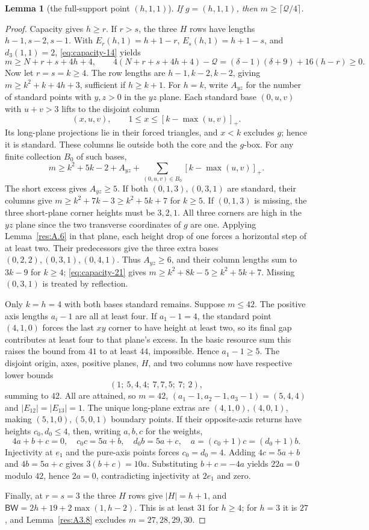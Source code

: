 \documentclass[11pt]{article}
\newtheorem{lemma}[theorem]{Lemma}
\theoremstyle{definition}
\theoremstyle{remark}
\theoremstyle{plain}
\begin{document}
\begin{lemma}[the full-support point $(h,1,1)$]\label{res:A3.6}
If $g=(h,1,1)$, then $m\ge\lceil \mathcal Q/4\rceil$.
\end{lemma}
\begin{proof}
Capacity gives $h\ge r$.  If $r>s$, the three $H$ rows have lengths
$h-1,s-2,s-1$.  With $E_r(h,1)=h+1-r$, $E_s(h,1)=h+1-s$,
and $d_3(1,1)=2$, \eqref{eq:capacity-14} yields
\[
 m\ge N+r+s+4h+4,\qquad
 4(N+r+s+4h+4)-\mathcal Q=(\delta-1)(\delta+9)+16(h-r)\ge0.
\]
Now let $r=s=k\ge4$.  The row lengths are $h-1,k-2,k-2$, giving
$m\ge k^2+k+4h+3$, sufficient if $h\ge k+1$.
For $h=k$, write $A_{yz}$ for the number of standard points with $y,z>0$ in the $yz$ plane.
Each standard base $(0,u,v)$ with $u+v>3$ lifts to the disjoint column
\[
 (x,u,v),\qquad 1\le x\le[k-\max(u,v)]_+.
\]
Its long-plane projections lie in their forced triangles, and $x<k$
excludes $g$; hence it is standard.  These columns lie outside both the
core and the $g$-box.  For any finite collection $B_0$ of such bases,
\[
 m\ge k^2+5k-2+A_{yz}
       +\sum_{(0,u,v)\in B_0}[k-\max(u,v)]_+.\tag{3.21}\label{eq:capacity-21}
\]
The short excess gives $A_{yz}\ge5$.  If both $(0,1,3),(0,3,1)$ are
standard, their columns give $m\ge k^2+7k-3\ge k^2+5k+7$ for $k\ge5$.
If $(0,1,3)$ is missing, the three short-plane corner heights must be
$3,2,1$. All three corners are high in the $yz$ plane since the two
transverse coordinates of $g$ are one. Applying Lemma~\ref{res:A.6}
in that plane, each height drop of one forces a horizontal step of at
least two.  Their predecessors
give the three extra bases $(0,2,2),(0,3,1),(0,4,1)$.
Thus $A_{yz}\ge6$, and their column lengths sum to $3k-9$ for $k\ge4$;
\eqref{eq:capacity-21} gives $m\ge k^2+8k-5\ge k^2+5k+7$.
Missing $(0,3,1)$ is treated by reflection.

Only $k=h=4$ with both bases standard remains. Suppose $m\le42$.
The positive axis lengths $a_i-1$ are all at least four.
If $a_1-1=4$, the standard point $(4,1,0)$ forces the last $xy$ corner to
have height at least two, so its final gap contributes at least four
to that plane's excess.  In the basic resource sum this raises the
bound from $41$ to at least $44$, impossible. Hence $a_1-1\ge5$.
The disjoint origin, axes, positive planes, $H$, and two columns now
have respective lower bounds
\[
 (1;\ 5,4,4;\ 7,7,5;\ 7;\ 2),
\]
summing to $42$.  All are attained, so $m=42$,
$(a_1-1,a_2-1,a_3-1)=(5,4,4)$ and $|E_{12}|=|E_{13}|=1$.
The unique long-plane extras are $(4,1,0),(4,0,1)$, making
$(5,1,0),(5,0,1)$ boundary points.  If their opposite-axis returns
have heights $c_0,d_0\le4$, then, writing $a,b,c$ for the weights,
\[
 4a+b+c=0,\quad c_0c=5a+b,\quad d_0b=5a+c,
 \quad a=(c_0+1)c=(d_0+1)b.
\]
Injectivity at $e_1$ and the pure-axis points forces $c_0=d_0=4$.
Adding $4c=5a+b$ and $4b=5a+c$ gives $3(b+c)=10a$.
Substituting $b+c=-4a$ yields $22a=0$ modulo $42$, hence $2a=0$,
contradicting injectivity at $2e_1$ and zero.

Finally, at $r=s=3$ the three $H$ rows give $|H|=h+1$, and
$\mathsf{BW}=2h+19+2\max(1,h-2)$.
This is at least $31$ for $h\ge4$; for $h=3$ it is $27$, and Lemma~\ref{res:A3.8}
excludes $m=27,28,29,30$. \end{proof}
\end{document}
